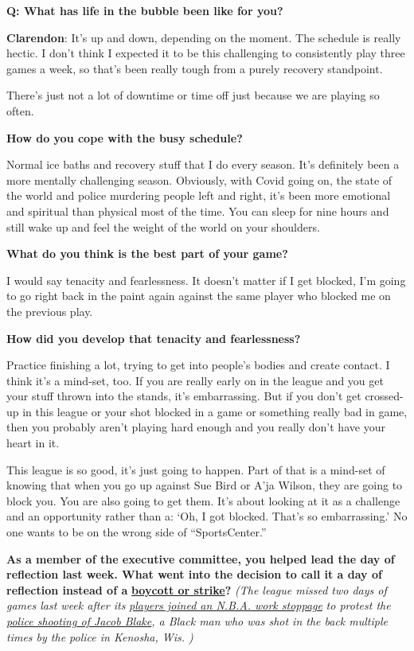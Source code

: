 \textbf{Q: What has life in the bubble been like for you?}

\textbf{Clarendon}: It's up and down, depending on the moment. The
schedule is really hectic. I don't think I expected it to be this
challenging to consistently play three games a week, so that's been
really tough from a purely recovery standpoint.

There's just not a lot of downtime or time off just because we are
playing so often.

\textbf{How do you cope with the busy schedule?}

Normal ice baths and recovery stuff that I do every season. It's
definitely been a more mentally challenging season. Obviously, with
Covid going on, the state of the world and police murdering people left
and right, it's been more emotional and spiritual than physical most of
the time. You can sleep for nine hours and still wake up and feel the
weight of the world on your shoulders.

\textbf{What do you think is the best part of your game?}

I would say tenacity and fearlessness. It doesn't matter if I get
blocked, I'm going to go right back in the paint again against the same
player who blocked me on the previous play.

\textbf{How did you develop that tenacity and fearlessness?}

Practice finishing a lot, trying to get into people's bodies and create
contact. I think it's a mind-set, too. If you are really early on in the
league and you get your stuff thrown into the stands, it's embarrassing.
But if you don't get crossed-up in this league or your shot blocked in a
game or something really bad in game, then you probably aren't playing
hard enough and you really don't have your heart in it.

This league is so good, it's just going to happen. Part of that is a
mind-set of knowing that when you go up against Sue Bird or A'ja Wilson,
they are going to block you. You are also going to get them. It's about
looking at it as a challenge and an opportunity rather than a: `Oh, I
got blocked. That's so embarrassing.' No one wants to be on the wrong
side of ``SportsCenter.''

\textbf{As a member of the executive committee, you helped lead the day
of reflection last week. What went into the decision to call it a day of
reflection instead of a}
\textbf{\href{https://www.nytimes3xbfgragh.onion/2020/08/27/us/difference-boycott-strike-nba.html}{boycott
or strike}?} \emph{(The league missed two days of games last week after
its}
\href{https://www.nytimes3xbfgragh.onion/2020/08/27/sports/basketball/kenosha-nba-protests-players-boycott.html}{\emph{players
joined an N.B.A. work stoppage}} \emph{to protest the}
\href{https://www.nytimes3xbfgragh.onion/2020/08/28/us/kenosha-shooting-protests.html}{\emph{police
shooting of Jacob Blake}}\emph{, a Black man who was shot in the back
multiple times by the police in Kenosha, Wis. )}


